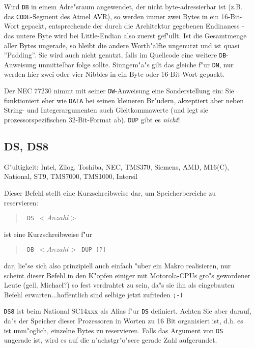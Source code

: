 \documentclass[12pt,a4paper,twoside]{report}
\makeatletter
\newcommand{\tty}[1]{{\tt #1}}
\newcommand{\ttindex}[1]{\index{#1@{\tt #1}}}
\makeatother
\begin{document}
Wird \tty{DB} in einem Adre"sraum angewendet, der nicht byte-adressierbar
ist (z.B. das \tty{CODE}-Segment des Atmel AVR), so werden immer zwei Bytes
in ein 16-Bit-Wort gepackt, entsprechende der durch die Architektur gegebenen 
Endinaness - das untere Byte wird bei Little-Endian also zuerst gef"ullt.  Ist
die Gesamtmenge aller Bytes ungerade, so bleibt die andere Worth"alfte ungenutzt
und ist quasi ''Padding''.  Sie wird auch nicht genutzt, falls im Quellcode
eine weitere \tty{DB}-Anweisung unmittelbar folge sollte.  Sinngem"a"s gilt
das gleiche f"ur \tty{DN}, nur werden hier zwei oder vier Nibbles in ein Byte
oder 16-Bit-Wort gepackt.

Der NEC 77230 nimmt mit seiner \tty{DW}-Anweisung eine Sonderstellung ein:
Sie funktioniert eher wie \tty{DATA} bei seinen kleineren Br"udern,
akzeptiert aber neben String- und Integerargumenten auch Gleitkommawerte
(und legt sie prozessorspezifischen 32-Bit-Format ab). \tty{DUP} gibt es {\em
nicht}!


\subsection{DS, DS8}
\ttindex{DS}
\ttindex{DS8}

{\em\begin{tabbing}
G"ultigkeit: \= Intel, Zilog, Toshiba, NEC, TMS370, Siemens, AMD, M16(C),\\
             \> National, ST9, TMS7000, TMS1000, Intersil
\end{tabbing}}

Dieser Befehl stellt eine Kurzschreibweise dar, um Speicherbereiche
zu reservieren:
\begin{quote}{\tt
        DS       $<Anzahl>$
}\end{quote}
ist eine Kurzschreibweise f"ur
\begin{quote}{\tt
        DB       $<Anzahl>$ DUP (?)
}\end{quote}
dar, lie"se sich also prinzipiell auch einfach "uber ein Makro realisieren,
nur scheint dieser Befehl in den K"opfen einiger mit Motorola-CPUs gro"s
gewordener Leute (gell, Michael?) so fest verdrahtet zu sein, da"s sie
ihn als eingebauten Befehl erwarten...hoffentlich sind selbige jetzt
zufrieden {\tt ;-)}

{\tt DS8} ist beim National SC14xxx als Alias f"ur {\tt DS} definiert.
Achten Sie aber darauf, da"s der Speicher dieser Prozessoren in Worten zu
16 Bit organisiert ist, d.h. es ist unm"oglich, einzelne Bytes zu
reservieren.  Falls das Argument von {\tt DS} ungerade ist, wird es auf
die n"achstgr"o"sere gerade Zahl aufgerundet.
\end{document}
